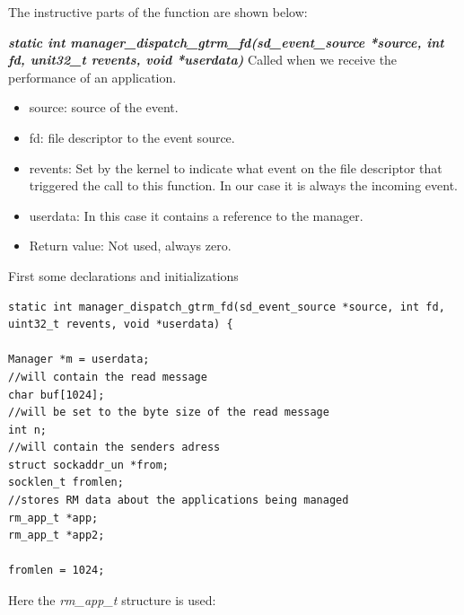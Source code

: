 \documentclass[nobiblatex]{LTHthesis}
\begin{document}
The instructive parts of the function are shown below:

\begin{framed}
		\begin{flushleft}
			\textbf{\emph{static int manager\_dispatch\_gtrm\_fd(sd\_event\_source *source, int fd, unit32\_t revents, void *userdata)}}\newline
				Called when we receive the performance of an application.
				\begin{itemize}
				\item source: source of the event.
				\item fd: file descriptor to the event source.
				\item revents: Set by the kernel to indicate what event on the file descriptor that triggered the call to this function. In our case it is always the incoming event.
				\item userdata: In this case it contains a reference to the manager.
				\item Return value: Not used, always zero.
				\end{itemize}
		\end{flushleft}	
\end{framed}





First some declarations and initializations

\begin{verbatim}
static int manager_dispatch_gtrm_fd(sd_event_source *source, int fd,
uint32_t revents, void *userdata) {

Manager *m = userdata;    		    
//will contain the read message
char buf[1024];
//will be set to the byte size of the read message
int n;
//will contain the senders adress
struct sockaddr_un *from;
socklen_t fromlen;
//stores RM data about the applications being managed
rm_app_t *app;
rm_app_t *app2;	

fromlen = 1024;
\end{verbatim}

Here the \emph{rm\_app\_t} structure is used:
\end{document}
